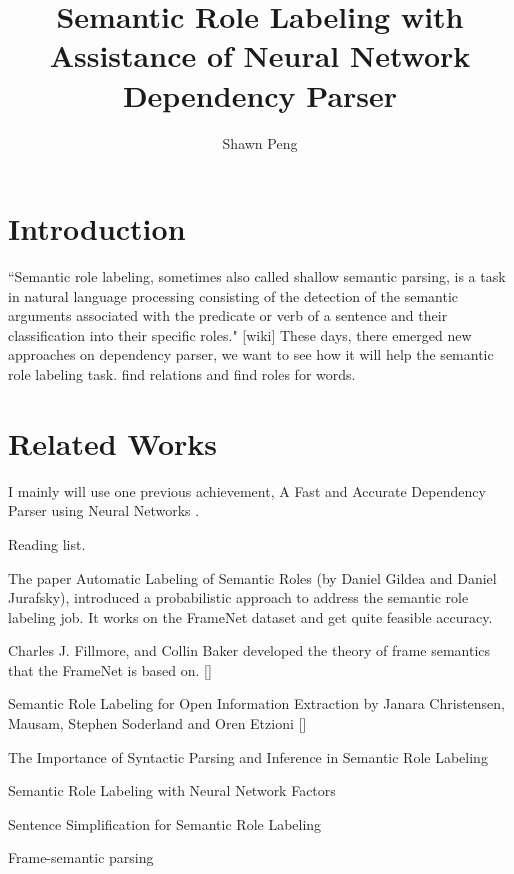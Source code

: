 \documentclass[letterpaper]{article}
\title{Semantic Role Labeling with Assistance of Neural Network Dependency Parser}
\author{Shawn Peng}
\begin{document}
\maketitle
{}
{}

\flushleft

\section{Introduction}
``Semantic role labeling, sometimes also called shallow semantic parsing, is a task in natural language processing consisting of the detection of the semantic arguments associated with the predicate or verb of a sentence and their classification into their specific roles." [wiki]
These days, there emerged new approaches on dependency parser, we want to see how it will help the semantic role labeling task.
find relations and find roles for words.



\section{Related Works}
I mainly will use one previous achievement, A Fast and Accurate Dependency Parser using Neural Networks \cite{manning-EtAl:2014:P14-5}.

\bigskip
Reading list.

\bigskip
The paper Automatic Labeling of Semantic Roles (by Daniel Gildea and Daniel Jurafsky)\cite{Gildea:2002:ALS:643092.643093}, introduced a probabilistic approach to address the semantic role labeling job. It works on the FrameNet dataset and get quite feasible accuracy.

\bigskip
Charles J. Fillmore, and Collin Baker developed the theory of frame semantics that the FrameNet is based on. []

\bigskip
Semantic Role Labeling for Open Information Extraction by Janara Christensen, Mausam, Stephen Soderland and Oren Etzioni []

\bigskip
The Importance of Syntactic Parsing and	Inference in Semantic Role Labeling \cite{Punyakanok}

\bigskip
Semantic Role Labeling with Neural Network Factors \cite{FitzGerald2015SemanticRL}

\bigskip
Sentence Simplification for Semantic Role Labeling \cite{Woodsend:2014:TRI:2750423.2750426}

\bigskip
Frame-semantic parsing \cite{Das:2014}
\end{document}
